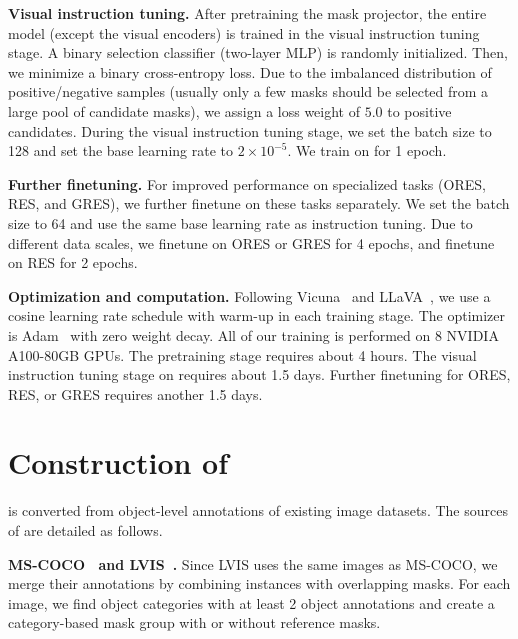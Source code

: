 \noindent\textbf{Visual instruction tuning.} After pretraining the mask projector, the entire \ourmodel model (except the visual encoders) is trained in the visual instruction tuning stage. A binary selection classifier (two-layer MLP) is randomly initialized. Then, we minimize a binary cross-entropy loss. Due to the imbalanced distribution of positive/negative samples (usually only a few masks should be selected from a large pool of candidate masks), we assign a loss weight of $5.0$ to positive candidates. During the visual instruction tuning stage, we set the batch size to 128 and set the base learning rate to $2\times 10^{-5}$. We train on \ourlargedata for 1 epoch.

\noindent\textbf{Further finetuning.} For improved performance on specialized tasks (ORES, RES, and GRES), we further finetune \ourmodel on these tasks separately. We set the batch size to 64 and use the same base learning rate as instruction tuning. Due to different data scales, we finetune \ourmodel on ORES or GRES for 4 epochs, and finetune \ourmodel on RES for 2 epochs.

\noindent\textbf{Optimization and computation.} Following Vicuna~\cite{vicuna2023} and LLaVA~\cite{liu2023visual}, we use a cosine learning rate schedule with warm-up in each training stage. The optimizer is Adam~\cite{kingma2015adam} with zero weight decay. All of our training is performed on 8 NVIDIA A100-80GB GPUs. The pretraining stage requires about 4 hours. The visual instruction tuning stage on \ourlargedata requires about 1.5 days. Further finetuning for ORES, RES, or GRES requires another 1.5 days.

\section{Construction of \ourlargedata}
\label{sec:supp-ourlargedata}
\ourlargedata is converted from object-level annotations of existing image datasets. The sources of \ourlargedata are detailed as follows.

\noindent\textbf{MS-COCO~\cite{lin2014microsoft} and LVIS~\cite{gupta2019lvis}.} Since LVIS uses the same images as MS-COCO, we merge their annotations by combining instances with overlapping masks. For each image, we find object categories with at least 2 object annotations and create a category-based mask group with or without reference masks.


